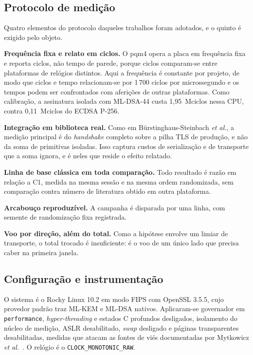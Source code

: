 \documentclass[conference]{IEEEtran}
\begin{document}
\subsection{Protocolo de medição}
\label{sec:protocolo}

Quatro elementos do protocolo daqueles trabalhos foram adotados, e o quinto é
exigido pelo objeto.

\textbf{Frequência fixa e relato em ciclos.} O pqm4 opera a placa em frequência
fixa e reporta ciclos, não tempo de parede, porque ciclos comparam-se entre
plataformas de relógios distintos. Aqui a frequência é constante por projeto, de
modo que ciclos e tempo relacionam-se por 1\,700 ciclos por microssegundo e os
tempos podem ser confrontados com aferições de outras plataformas. Como
calibração, a assinatura isolada com ML-DSA-44 custa 1,95~Mciclos nessa CPU,
contra 0,11~Mciclos do ECDSA P-256.

\textbf{Integração em biblioteca real.} Como em Bürstinghaus-Steinbach \textit{et
al.}, a medição principal é do \textit{handshake} completo sobre a pilha TLS de
produção, e não da soma de primitivas isoladas. Isso captura custos de
serialização e de transporte que a soma ignora, e é neles que reside o efeito
relatado.

\textbf{Linha de base clássica em toda comparação.} Todo resultado é razão em
relação a C1, medida na mesma sessão e na mesma ordem randomizada, sem comparação
contra número de literatura obtido em outra plataforma.

\textbf{Arcabouço reproduzível.} A campanha é disparada por uma linha, com
semente de randomização fixa registrada.

\textbf{Voo por direção, além do total.} Como a hipótese envolve um limiar de
transporte, o total trocado é insuficiente: é o voo de um único lado que precisa
caber na primeira janela.

\subsection{Configuração e instrumentação}
\label{sec:config}

O sistema é o Rocky Linux 10.2 em modo FIPS com OpenSSL 3.5.5, cujo provedor
padrão traz ML-KEM e ML-DSA nativos. Aplicaram-se governador em
\texttt{performance}, \textit{hyper-threading} e estados C profundos desligados,
isolamento do núcleo de medição, ASLR desabilitado, \textit{swap} desligado e
páginas transparentes desabilitadas, medidas que atacam as fontes de viés
documentadas por Mytkowicz \textit{et al.}~\cite{mytkowicz2009wrong}. O relógio é
o \texttt{CLOCK\_MONOTONIC\_RAW}.
\end{document}
